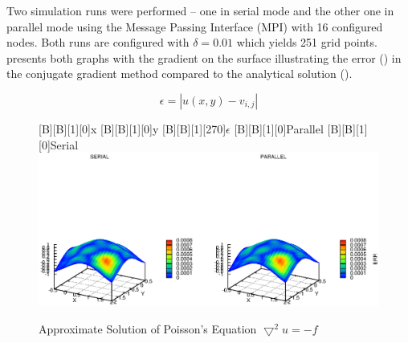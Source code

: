 \documentclass[12pt,a4paper]{report}
\begin{document}
Two simulation runs were performed -- one in serial mode and the other
one in parallel mode using the Message Passing Interface (MPI) with 16
configured nodes. Both runs are configured with $\delta=0.01$ which
yields 251 grid points.  presents both
graphs with the gradient on the surface illustrating the error
() in the conjugate gradient method compared to
the analytical solution ().

\begin{equation}
  \label{eq:error}
  \epsilon=|u(x,y)-v_{i,j}|
\end{equation}

\begin{figure}[htb]
  [B][B][1][0]{x}
  [B][B][1][0]{y}
  [B][B][1][270]{$\epsilon$}
  [B][B][1][0]{Parallel}
  [B][B][1][0]{Serial}
  \includegraphics{./images/poiss.eps}
  \caption{Approximate Solution of Poisson's Equation
    $\bigtriangledown^{2}u=-f$}
  \label{fig:approxPoiss}
\end{figure}
\end{document}
